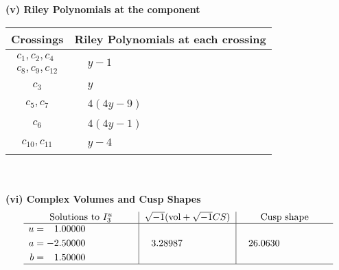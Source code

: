 \documentclass[1p]{elsarticle_modified}
\theoremstyle{definition}
\newcommand{\I}{\sqrt{-1}}
\begin{document}
\flushleft \textbf{(v) Riley Polynomials at the component}\newline \\
\begin{tabular}{m{50pt}|m{274pt}}
Crossings & \hspace{64pt}Riley Polynomials at each crossing \\
\hline $$\begin{aligned}c_{1},c_{2},c_{4}\\c_{8},c_{9},c_{12}\end{aligned}$$&$\begin{aligned}
&y-1
\end{aligned}$\\
\hline $$\begin{aligned}c_{3}\end{aligned}$$&$\begin{aligned}
&y
\end{aligned}$\\
\hline $$\begin{aligned}c_{5},c_{7}\end{aligned}$$&$\begin{aligned}
&4(4 y-9)
\end{aligned}$\\
\hline $$\begin{aligned}c_{6}\end{aligned}$$&$\begin{aligned}
&4(4 y-1)
\end{aligned}$\\
\hline $$\begin{aligned}c_{10},c_{11}\end{aligned}$$&$\begin{aligned}
&y-4
\end{aligned}$\\
\hline
\end{tabular}\\~\\
\newpage\flushleft \textbf{(vi) Complex Volumes and Cusp Shapes}
$$\begin{array}{c|c|c}  
\text{Solutions to }I^u_{3}& \I (\text{vol} + \sqrt{-1}CS) & \text{Cusp shape}\\
 \hline 
\begin{aligned}
u &= \phantom{-}1.00000\phantom{ +0.000000I} \\
a &= -2.50000\phantom{ +0.000000I} \\
b &= \phantom{-}1.50000\phantom{ +0.000000I}\end{aligned}
 & \phantom{-}3.28987\phantom{ +0.000000I} & \phantom{-}26.0630\phantom{ +0.000000I}\\
 \hline 
 \end{array}$$\newpage\newpage\renewcommand{\arraystretch}{1}
\end{document}
